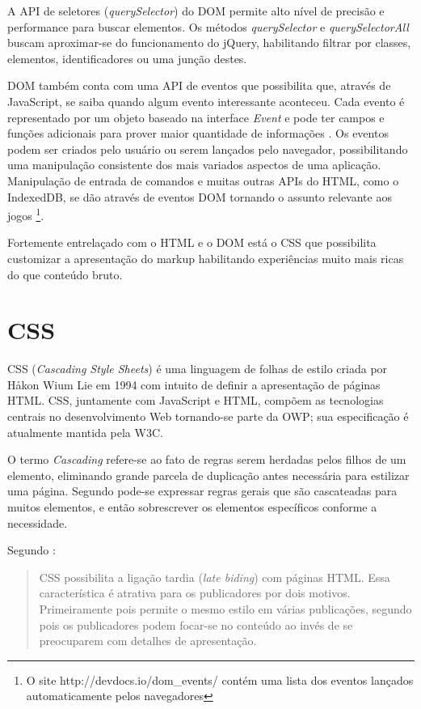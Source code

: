 A API de seletores (\textit{querySelector}) do DOM permite alto
nível de precisão e performance para buscar elementos. Os métodos
\textit{querySelector} e \textit{querySelectorAll} buscam aproximar-se
do funcionamento do jQuery, habilitando filtrar por classes, elementos,
identificadores ou uma junção destes.

DOM também conta com uma API de eventos que possibilita que, através
de JavaScript, se saiba quando algum evento interessante aconteceu.
Cada evento é representado por um objeto baseado na interface
\textit{Event} e pode ter campos e funções adicionais para prover
maior quantidade de informações \autocite{devdocs}. Os eventos
podem ser criados pelo usuário ou serem lançados pelo navegador,
possibilitando uma manipulação consistente dos mais variados
aspectos de uma aplicação. Manipulação de entrada de comandos e
muitas outras APIs do HTML, como o IndexedDB, se dão através
de eventos DOM tornando o assunto relevante aos jogos \footnote{O site
http://devdocs.io/dom\_events/ contém uma lista dos eventos lançados
automaticamente pelos navegadores}.

Fortemente entrelaçado com o HTML e o DOM está o CSS que possibilita
customizar a apresentação do markup habilitando experiências muito
mais ricas do que conteúdo bruto.
\section{CSS}
CSS (\textit{Cascading Style Sheets}) é uma linguagem de folhas de
estilo criada por Håkon Wium Lie em 1994 com intuito de definir a
apresentação de páginas HTML. CSS, juntamente com JavaScript e HTML,
compõem as tecnologias centrais no desenvolvimento Web tornando-se
parte da OWP; sua especificação é atualmente mantida pela W3C.

O termo \textit{Cascading} refere-se ao fato de regras serem
herdadas pelos filhos de um elemento, eliminando grande parcela de
duplicação antes necessária para estilizar uma página. Segundo
\citet{html5mostwanted} pode-se expressar regras gerais que são
\textquotedbl cascateadas\textquotedbl{} para muitos elementos, e então sobrescrever os elementos
específicos conforme a necessidade.

Segundo \citet[p. 23--24]{CascadingStyleSheets}:
\begin{quote}
CSS possibilita a ligação tardia (\textit{late biding}) com
páginas HTML. Essa característica é atrativa para os publicadores
por dois motivos. Primeiramente pois permite o mesmo estilo em várias
publicações, segundo pois os publicadores podem focar-se no conteúdo
ao invés de se preocuparem com detalhes de apresentação.
\end{quote}

